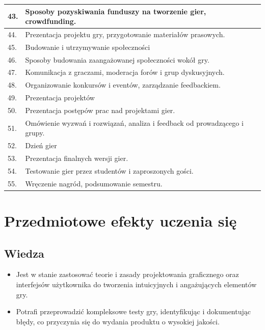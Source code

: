\documentclass[12pt, a4paper]{article}
\begin{document}
\begin{longtable}{|p{1.5cm}|p{6.5cm}|p{6.5cm}|}
  \hline
  43. & Sposoby pozyskiwania funduszy na tworzenie gier, crowdfunding. &  \\
  \hline
  44. & Prezentacja projektu gry, przygotowanie materiałów prasowych. &  \\
  \hline
  45. & Budowanie i utrzymywanie społeczności &  \\
  \hline
  46. & Sposoby budowania zaangażowanej społeczności wokół gry. &  \\
  \hline
  47. & Komunikacja z graczami, moderacja forów i grup dyskusyjnych. &  \\
  \hline
  48. & Organizowanie konkursów i eventów, zarządzanie feedbackiem. &  \\
  \hline
  49. & Prezentacja projektów &  \\
  \hline
  50. & Prezentacja postępów prac nad projektami gier. &  \\
  \hline
  51. & Omówienie wyzwań i rozwiązań, analiza i feedback od prowadzącego i grupy. &  \\
  \hline
  52. & Dzień gier &  \\
  \hline
  53. & Prezentacja finalnych wersji gier. &  \\
  \hline
  54. & Testowanie gier przez studentów i zaproszonych gości. &  \\
  \hline
  55. & Wręczenie nagród, podsumowanie semestru. &  \\
  \hline
\end{longtable}

\section{Przedmiotowe efekty uczenia się}

\subsection*{Wiedza}
\begin{itemize}
  \item Jest w stanie zastosować teorie i zasady projektowania graficznego oraz interfejsów użytkownika do tworzenia intuicyjnych i angażujących elementów gry.
  \item Potrafi przeprowadzić kompleksowe testy gry, identyfikując i dokumentując błędy, co przyczynia się do wydania produktu o wysokiej jakości.
\end{itemize}
\end{document}
